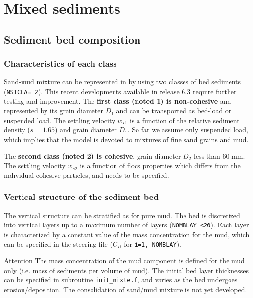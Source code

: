 \section{Mixed sediments}%

\label{ch:mixed}

\subsection{Sediment bed composition}

\subsubsection{Characteristics of each class}
Sand-mud mixture can be represented in \sisyphe by using two classes of bed
sediments (\texttt{NSICLA= 2}). This recent developments available in release 6.3
require further testing and improvement. 
The \textbf{first class (noted 1) is non-cohesive} and represented by its grain
diameter $D_1$ and can be transported as bed-load or suspended load. The
settling velocity $w_{s1}$ is a function of the relative sediment density
($s=1.65$) and grain diameter $D_1$. So far we assume only suspended load,
which implies that the model is devoted to mixtures of fine sand grains and
mud.

The \textbf{second class (noted 2) is cohesive}, grain diameter $D_2$ less than $60$
mm. The settling velocity $w_{s2}$ is a function of flocs properties which
differs from the individual cohesive particles, and needs to be specified. 

\subsubsection{Vertical structure of the sediment bed}
The vertical structure can be stratified as for pure mud. The bed is
discretized into vertical layers up to a maximum number of layers (\texttt{NOMBLAY <20}). 
Each layer is characterized by a constant value of the mass
concentration for the mud, which can be specified in the steering file ($C_{si}$ for \texttt{i=1, NOMBLAY}). 

\begin{bclogo}[couleur = blue!10, arrondi = 0.10, logo = \bcattention]{\textsf{Attention}}
The mass concentration of the mud component is defined for the mud
only (i.e. mass of sediments per volume of mud). The initial bed layer
thicknesses can be specified in subroutine \texttt{init\_mixte.f}, and varies as the
bed undergoes erosion/deposition. The consolidation of sand/mud mixture is
not yet developed.
\end{bclogo}

